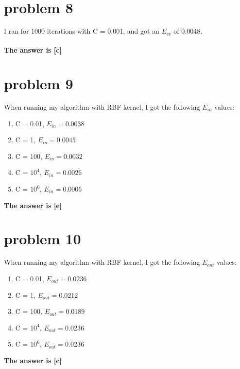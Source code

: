 \documentclass{article}
\begin{document}
\section*{problem 8} 
I ran for 1000 iterations with C = 0.001, and got an $E_{cv}$ of 0.0048.\\\\
\textbf{The answer is [c]}

\section*{problem 9}
When running my algorithm with RBF kernel, I got the following $E_{in}$ values:
\begin{enumerate}[label=(\alph*)]
    \item C = 0.01, $E_{in} = 0.0038$
    \item C = 1, $E_{in} = 0.0045$
    \item C = 100, $E_{in} = 0.0032$
    \item C = $10^4$, $E_{in} = 0.0026$
    \item C = $10^6$, $E_{in} = 0.0006$
\end{enumerate}
\textbf{The answer is [e]}

\section*{problem 10}
When running my algorithm with RBF kernel, I got the following $E_{out}$ values:
\begin{enumerate}[label=(\alph*)]
    \item C = 0.01, $E_{out} = 0.0236$
    \item C = 1, $E_{out} = 0.0212$
    \item C = 100, $E_{out} = 0.0189$
    \item C = $10^4$, $E_{out} = 0.0236$
    \item C = $10^6$, $E_{out} = 0.0236$
\end{enumerate}
\textbf{The answer is [c]}
\end{document}
